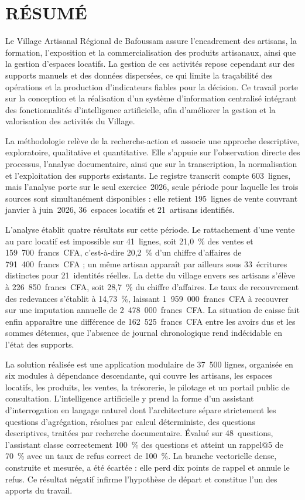 \chapter*{RÉSUMÉ}

Le Village Artisanal Régional de Bafoussam assure l'encadrement des artisans, la formation, l'exposition et la commercialisation des produits artisanaux, ainsi que la gestion d'espaces locatifs. La gestion de ces activités repose cependant sur des supports manuels et des données dispersées, ce qui limite la traçabilité des opérations et la production d'indicateurs fiables pour la décision. Ce travail porte sur la conception et la réalisation d'un système d'information centralisé intégrant des fonctionnalités d'intelligence artificielle, afin d'améliorer la gestion et la valorisation des activités du Village.

La méthodologie relève de la recherche-action et associe une approche descriptive, exploratoire, qualitative et quantitative. Elle s'appuie sur l'observation directe des processus, l'analyse documentaire, ainsi que sur la transcription, la normalisation et l'exploitation des supports existants. Le registre transcrit compte 603~lignes, mais l'analyse porte sur le seul exercice~2026, seule période pour laquelle les trois sources sont simultanément disponibles : elle retient 195~lignes de vente couvrant janvier à juin~2026, 36~espaces locatifs et 21~artisans identifiés.

L'analyse établit quatre résultats sur cette période. Le rattachement d'une vente au parc locatif est impossible sur 41~lignes, soit 21,0~\% des ventes et 159~700~francs~CFA, c'est-à-dire 20,2~\% d'un chiffre d'affaires de 791~400~francs~CFA ; un même artisan apparaît par ailleurs sous 33~écritures distinctes pour 21~identités réelles. La dette du village envers ses artisans s'élève à 226~850~francs~CFA, soit 28,7~\% du chiffre d'affaires. Le taux de recouvrement des redevances s'établit à 14,73~\%, laissant 1~959~000~francs~CFA à recouvrer sur une imputation annuelle de 2~478~000~francs~CFA. La situation de caisse fait enfin apparaître une différence de 162~525~francs~CFA entre les avoirs dus et les sommes détenues, que l'absence de journal chronologique rend indécidable en l'état des supports.

La solution réalisée est une application modulaire de 37~500 lignes, organisée en six modules à dépendance descendante, qui couvre les artisans, les espaces locatifs, les produits, les ventes, la trésorerie, le pilotage et un portail public de consultation. L'intelligence artificielle y prend la forme d'un assistant d'interrogation en langage naturel dont l'architecture sépare strictement les questions d'agrégation, résolues par calcul déterministe, des questions descriptives, traitées par recherche documentaire. Évalué sur 48~questions, l'assistant classe correctement 100~\% des questions et atteint un rappel@5 de 70~\% avec un taux de refus correct de 100~\%. La branche vectorielle dense, construite et mesurée, a été écartée : elle perd dix points de rappel et annule le refus. Ce résultat négatif infirme l'hypothèse de départ et constitue l'un des apports du travail.

